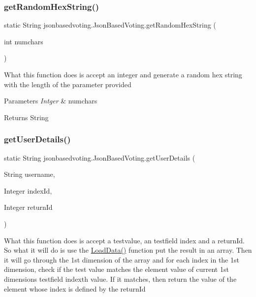 \subsubsection{\texorpdfstring{getRandomHexString()}{getRandomHexString()}}
{\footnotesize\ttfamily static String jsonbasedvoting.\+Json\+Based\+Voting.\+get\+Random\+Hex\+String (\begin{DoxyParamCaption}\item[{int}]{numchars }\end{DoxyParamCaption})\hspace{0.3cm}{\ttfamily [static]}}

What this function does is accept an integer and generate a random hex string with the length of the parameter provided 
\begin{DoxyParams}{Parameters}
{\em Intger} & numchars \\
\hline
\end{DoxyParams}
\begin{DoxyReturn}{Returns}
String 
\end{DoxyReturn}
\mbox{\label{classjsonbasedvoting_1_1_json_based_voting_a680b57ed482d3bb4b0427d7219712823}} 
\subsubsection{\texorpdfstring{getUserDetails()}{getUserDetails()}}
{\footnotesize\ttfamily static String jsonbasedvoting.\+Json\+Based\+Voting.\+get\+User\+Details (\begin{DoxyParamCaption}\item[{String}]{username,  }\item[{Integer}]{index\+Id,  }\item[{Integer}]{return\+Id }\end{DoxyParamCaption})\hspace{0.3cm}{\ttfamily [static]}}

What this function does is accept a testvalue, an testfield index and a return\+Id. So what it will do is use the \mbox{\hyperlink{classjsonbasedvoting_1_1_json_based_voting_adbcb2c2a084932df90996c7199251579}{Load\+Data()}} function put the result in an array. Then it will go through the 1st dimension of the array and for each index in the 1st dimension, check if the test value matches the element value of current 1st dimension\textquotesingle{}s \textquotesingle{}testfield index\textquotesingle{}th value. If it matches, then return the value of the element whose index is defined by the return\+Id


